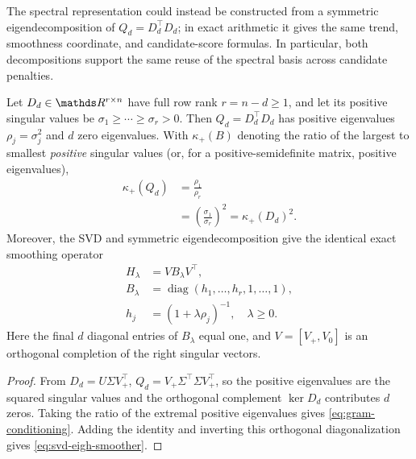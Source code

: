 The spectral representation could instead be constructed from a symmetric
eigendecomposition of $Q_d=D_d^\top D_d$; in exact arithmetic it gives
the same trend, smoothness coordinate, and candidate-score formulas.
In particular, both decompositions support the same reuse of the
spectral basis across candidate penalties.

\begin{proposition}
\label{prop:svd-vs-gram}
Let $D_d\in\R^{r\times n}$ have full row rank $r=n-d\geq1$,
and let its positive singular values be
$\sigma_1\geq\cdots\geq\sigma_r>0$. Then $Q_d=D_d^\top D_d$
has positive eigenvalues $\rho_j=\sigma_j^2$ and $d$ zero
eigenvalues. With $\kappa_+(B)$ denoting the ratio of the largest
to smallest \emph{positive} singular values (or, for a
positive-semidefinite matrix, positive eigenvalues),
\begin{equation}\label{eq:gram-conditioning}
\begin{aligned}
\kappa_+(Q_d)
&=\frac{\rho_1}{\rho_r}\\
&=\left(\frac{\sigma_1}{\sigma_r}\right)^2
=\kappa_+(D_d)^2.
\end{aligned}
\end{equation}
Moreover, the SVD and symmetric eigendecomposition give the identical
exact smoothing operator
\begin{equation}\label{eq:svd-eigh-smoother}
\begin{aligned}
H_\lambda &=V B_\lambda V^\top,\\
B_\lambda&=\operatorname{diag}(h_1,\ldots,h_r,1,\ldots,1),\\
h_j&=(1+\lambda\rho_j)^{-1},
\quad \lambda\geq0.
\end{aligned}
\end{equation}
Here the final $d$ diagonal entries of $B_\lambda$ equal one, and
$V=[V_+,V_0]$ is an orthogonal completion of the right singular
vectors.
\end{proposition}
\begin{proof}
From $D_d=U\Sigma V_+^\top$,
$Q_d=V_+\Sigma^\top\Sigma V_+^\top$, so the positive eigenvalues
are the squared singular values and the orthogonal complement
$\ker D_d$ contributes $d$ zeros. Taking the ratio of the extremal
positive eigenvalues gives \eqref{eq:gram-conditioning}.
Adding the identity and inverting this orthogonal diagonalization
gives \eqref{eq:svd-eigh-smoother}.
\end{proof}

